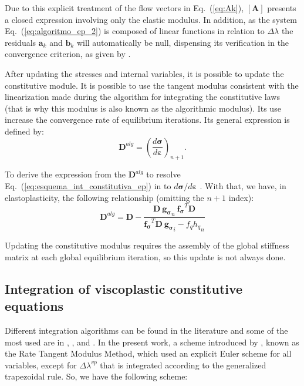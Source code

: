 \documentclass[Journal,letterpaper]{ascelike-new}
\newcommand{\All}{\boldsymbol A}
\newcommand{\al}{\boldsymbol a}
\newcommand{\bl}{\boldsymbol b}
\newcommand{\dfds}{\boldsymbol{f_\sigma}}
\newcommand{\dfdq}{{f_q}}
\newcommand{\dgds}{\boldsymbol{g_\sigma}}
\newcommand{\Dsdee}{\boldsymbol{D}}
\newcommand{\hl}{{h_q}}
\newcommand{\strain}{\boldsymbol{\varepsilon}}
\newcommand{\stress}{\boldsymbol{\sigma}}
\begin{document}
Due to this explicit treatment of the flow vectors in Eq.~(\ref{eq:Ak}), $\left[\All \right]$ presents a closed expression involving only the elastic modulus. In addition, as the system Eq.~(\ref{eq:algoritmo_ep_2}) is composed of linear functions in relation to $\Delta \lambda$ the residuals  $\al_k$ and $\bl_k$ will automatically be null, dispensing its verification in the convergence criterion, as given by . 

After updating the stresses and internal variables, it is possible to update the constitutive module. It is possible to use the tangent modulus consistent with the linearization made during the algorithm for integrating the constitutive laws (that is why this modulus is also known as the algorithmic modulus). Its use increase the convergence rate of equilibrium iterations. Its general expression is defined by:
\begin{equation}
	\label{eq:D_alg1}
	\Dsdee^{alg} = \left(\dfrac{d\stress}{d\strain} \right)_{n+1}.
\end{equation}

To derive the expression from the $\Dsdee^{alg}$ to resolve Eq.~(\ref{eq:esquema_int_constitutiva_ep}) in to $d\stress/d\strain$ \cite{belytschko2000}. With that, we have, in elastoplasticity, the following relationship (omitting the $n+1$ index): 
\begin{equation}
	\label{eq:D_alg_ep}
	\Dsdee^{alg} = \Dsdee - \dfrac{\Dsdee~\dgds_n~\dfds^T \Dsdee}{\dfds^T\Dsdee~\dgds_i-\dfdq \hl_n}
\end{equation}

Updating the constitutive modulus requires the assembly of the global stiffness matrix at each global equilibrium iteration, so this update is not always done.

\subsection{Integration of viscoplastic constitutive equations}

Different integration algorithms can be found in the literature and some of the most used are in , ,  and . In the present work, a scheme introduced by , known as the Rate Tangent Modulus Method, which used an explicit Euler scheme for all variables, except for $\Delta \lambda^{vp}$ that is integrated according to the generalized trapezoidal rule. So, we have the following scheme:
\end{document}
